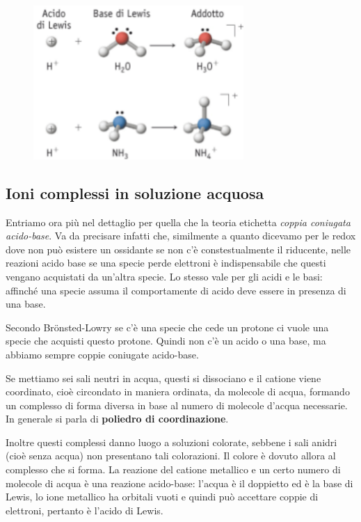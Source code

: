 \begin{figure}[htp]
    \centering
    \includegraphics[width=8cm]{immagini/acidi_e_basi_di_lewis.png}
\end{figure}

\subsection{Ioni complessi in soluzione acquosa}
Entriamo ora più nel dettaglio per quella che la teoria etichetta \textit{coppia coniugata acido-base}. Va da precisare infatti che, similmente a quanto dicevamo per le redox dove non può esistere un ossidante se non c'è constestualmente il riducente, nelle reazioni acido base se una specie perde elettroni è indispensabile che questi vengano acquistati da un'altra specie. Lo stesso vale per gli acidi e le basi: affinché una specie assuma il comportamente di acido deve essere in presenza di una base.

Secondo Br\"{o}nsted-Lowry se c'è una specie che cede un protone ci vuole una specie che acquisti questo protone. Quindi non c'è un acido o una base, ma abbiamo sempre coppie coniugate acido-base.

\vspace{0.2cm}Se mettiamo sei sali neutri in acqua, questi si dissociano e il catione viene coordinato, cioè circondato in maniera ordinata, da molecole di acqua, formando un complesso di forma diversa in base al numero di molecole d'acqua necessarie. In generale si parla di \textbf{poliedro di coordinazione}.

Inoltre questi complessi danno luogo a soluzioni colorate, sebbene i sali anidri (cioè senza acqua) non presentano tali colorazioni. Il colore è dovuto allora al complesso che si forma. La reazione del catione metallico e un certo numero di molecole di acqua è una reazione acido-base: l'acqua è il doppietto ed è la base di Lewis, lo ione metallico ha orbitali vuoti e quindi può accettare coppie di elettroni, pertanto è l'acido di Lewis.

